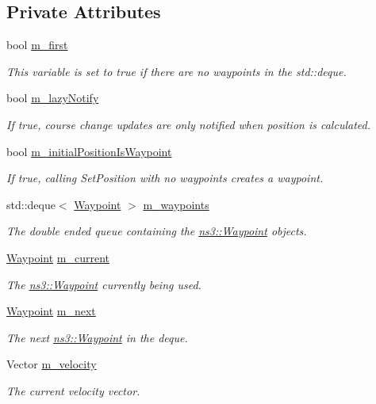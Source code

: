 \subsection*{Private Attributes}
\begin{DoxyCompactItemize}
\item 
bool \hyperlink{classns3_1_1WaypointMobilityModel_a878ef6945bf7a2346386ee1710234331}{m\+\_\+first}
\begin{DoxyCompactList}\small\item\em This variable is set to true if there are no waypoints in the std\+::deque. \end{DoxyCompactList}\item 
bool \hyperlink{classns3_1_1WaypointMobilityModel_a8da394b74b52cf59fbee7372167e6a45}{m\+\_\+lazy\+Notify}
\begin{DoxyCompactList}\small\item\em If true, course change updates are only notified when position is calculated. \end{DoxyCompactList}\item 
bool \hyperlink{classns3_1_1WaypointMobilityModel_a3db9542bf052bb86a2e335661016f352}{m\+\_\+initial\+Position\+Is\+Waypoint}
\begin{DoxyCompactList}\small\item\em If true, calling Set\+Position with no waypoints creates a waypoint. \end{DoxyCompactList}\item 
std\+::deque$<$ \hyperlink{classns3_1_1Waypoint}{Waypoint} $>$ \hyperlink{classns3_1_1WaypointMobilityModel_a8d30b488d6461e335cb443272528a29e}{m\+\_\+waypoints}
\begin{DoxyCompactList}\small\item\em The double ended queue containing the \hyperlink{classns3_1_1Waypoint}{ns3\+::\+Waypoint} objects. \end{DoxyCompactList}\item 
\hyperlink{classns3_1_1Waypoint}{Waypoint} \hyperlink{classns3_1_1WaypointMobilityModel_a8705ba992cf7e115c7f567393d7a6912}{m\+\_\+current}
\begin{DoxyCompactList}\small\item\em The \hyperlink{classns3_1_1Waypoint}{ns3\+::\+Waypoint} currently being used. \end{DoxyCompactList}\item 
\hyperlink{classns3_1_1Waypoint}{Waypoint} \hyperlink{classns3_1_1WaypointMobilityModel_acac78d6b87956c61ad2c8959381f125c}{m\+\_\+next}
\begin{DoxyCompactList}\small\item\em The next \hyperlink{classns3_1_1Waypoint}{ns3\+::\+Waypoint} in the deque. \end{DoxyCompactList}\item 
Vector \hyperlink{classns3_1_1WaypointMobilityModel_a0f1a1f647002bf2dcfea5f7f5776d1b1}{m\+\_\+velocity}
\begin{DoxyCompactList}\small\item\em The current velocity vector. \end{DoxyCompactList}\end{DoxyCompactItemize}

